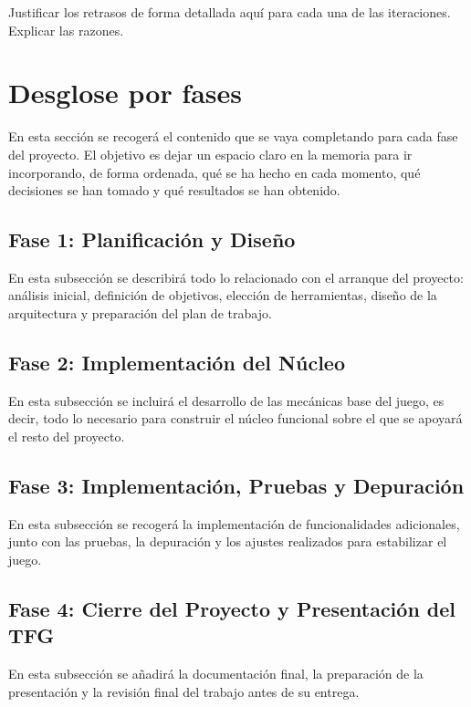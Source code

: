 Justificar los retrasos de forma detallada aquí para cada una de las iteraciones. Explicar las razones.

\section{Desglose por fases}

En esta sección se recogerá el contenido que se vaya completando para cada fase del proyecto. 
El objetivo es dejar un espacio claro en la memoria para ir incorporando, de forma ordenada, 
qué se ha hecho en cada momento, qué decisiones se han tomado y qué resultados se han obtenido.

\subsection{Fase 1: Planificación y Diseño}
En esta subsección se describirá todo lo relacionado con el arranque del proyecto: análisis inicial, 
definición de objetivos, elección de herramientas, diseño de la arquitectura y preparación del plan de trabajo.

\subsection{Fase 2: Implementación del Núcleo}
En esta subsección se incluirá el desarrollo de las mecánicas base del juego, es decir, todo lo necesario 
para construir el núcleo funcional sobre el que se apoyará el resto del proyecto.

\subsection{Fase 3: Implementación, Pruebas y Depuración}
En esta subsección se recogerá la implementación de funcionalidades adicionales, junto con las pruebas, 
la depuración y los ajustes realizados para estabilizar el juego.

\subsection{Fase 4: Cierre del Proyecto y Presentación del TFG}
En esta subsección se añadirá la documentación final, la preparación de la presentación y la revisión 
final del trabajo antes de su entrega.